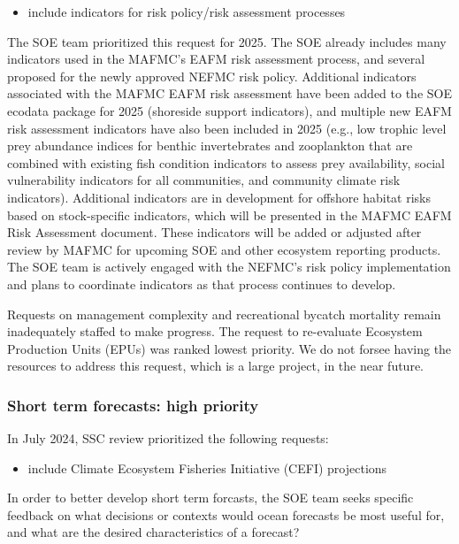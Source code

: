 \documentclass[
  10pt,
]{article}
\providecommand{\tightlist}{%
  \setlength{\itemsep}{0pt}\setlength{\parskip}{0pt}}
\begin{document}
\begin{itemize}
\tightlist
\item
  include indicators for risk policy/risk assessment processes
\end{itemize}

The SOE team prioritized this request for 2025. The SOE already includes
many indicators used in the MAFMC's EAFM risk assessment process, and
several proposed for the newly approved NEFMC risk policy. Additional
indicators associated with the MAFMC EAFM risk assessment have been
added to the SOE ecodata package for 2025 (shoreside support
indicators), and multiple new EAFM risk assessment indicators have also
been included in 2025 (e.g., low trophic level prey abundance indices
for benthic invertebrates and zooplankton that are combined with
existing fish condition indicators to assess prey availability, social
vulnerability indicators for all communities, and community climate risk
indicators). Additional indicators are in development for offshore
habitat risks based on stock-specific indicators, which will be
presented in the MAFMC EAFM Risk Assessment document. These indicators
will be added or adjusted after review by MAFMC for upcoming SOE and
other ecosystem reporting products. The SOE team is actively engaged
with the NEFMC's risk policy implementation and plans to coordinate
indicators as that process continues to develop.

Requests on management complexity and recreational bycatch mortality
remain inadequately staffed to make progress. The request to re-evaluate
Ecosystem Production Units (EPUs) was ranked lowest priority. We do not
forsee having the resources to address this request, which is a large
project, in the near future.

\subsubsection{Short term forecasts: high
priority}\label{short-term-forecasts-high-priority}

In July 2024, SSC review prioritized the following requests:

\begin{itemize}
\tightlist
\item
  include Climate Ecosystem Fisheries Initiative (CEFI) projections
\end{itemize}

In order to better develop short term forcasts, the SOE team seeks
specific feedback on what decisions or contexts would ocean forecasts be
most useful for, and what are the desired characteristics of a forecast?
\end{document}
